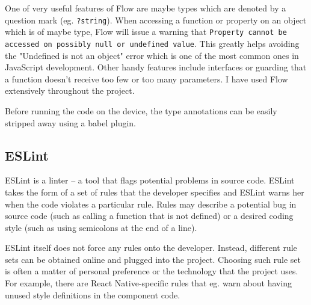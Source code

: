 

One of very useful features of Flow are maybe types which are denoted by a question mark (eg. \texttt{?string}). When accessing a function or property on an object which is of maybe type, Flow will issue a warning that \texttt{Property cannot be accessed on possibly null or undefined value}. This greatly helps avoiding the "Undefined is not an object" error which is one of the most common ones in JavaScript development. Other handy features include interfaces or guarding that a function doesn't receive too few or too many parameters. I have used Flow extensively throughout the project.

Before running the code on the device, the type annotations can be easily stripped away using a babel plugin.

\subsection{ESLint}

ESLint is a linter -- a tool that flags potential problems in source code. ESLint takes the form of a set of rules that the developer specifies and ESLint warns her when the code violates a particular rule. Rules may describe a potential bug in source code (such as calling a function that is not defined) or a desired coding style (such as using semicolons at the end of a line).

ESLint itself does not force any rules onto the developer. Instead, different rule sets can be obtained online and plugged into the project. Choosing such rule set is often a matter of personal preference or the technology that the project uses. For example, there are React Native-specific rules that eg. warn about having unused style definitions in the component code.